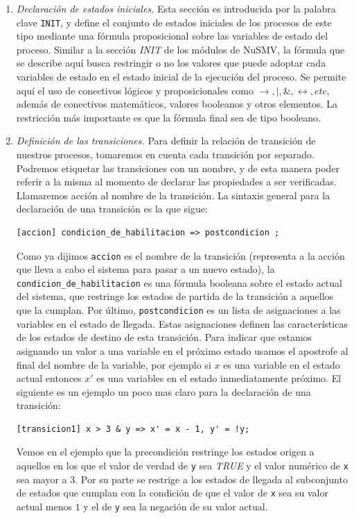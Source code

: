 \documentclass[titlepage, 12pt]{book}
\begin{document}
\begin{enumerate}
\item \textit{Declaraci\'on de estados iniciales.}
Esta secci\'on es introducida por la palabra clave \texttt{INIT}, y define el conjunto de estados iniciales de los procesos de este tipo mediante una f\'ormula proposicional sobre las variables de estado del proceso. Similar a la secci\'on \textit{INIT} de los m\'odulos de NuSMV, la f\'ormula que se describe aqu\'i busca restringir o no los valores que puede adoptar cada variables de estado en el estado inicial de la ejecuci\'on del proceso. Se permite aqu\'i el uso de conectivos l\'ogicos y proposicionales como $\rightarrow, |, \&, \leftrightarrow, etc$, adem\'as de conectivos matem\'aticos, valores booleanos y otros elementos. La restricci\'on m\'as importante es que la f\'ormula final sea de tipo booleano.

\item \textit{Definici\'on de las transiciones.}
Para definir la relaci\'on de transici\'on de nuestros procesos, tomaremos en cuenta cada transici\'on por separado. Podremos etiquetar las transiciones con un nombre, y de esta manera poder referir a la misma al momento de declarar las propiedades a ser verificadas. Llamaremos acci\'on al nombre de la transici\'on. La sintaxis general para la declaraci\'on de una transici\'on es la que sigue: 
\begin{verbatim}
[accion] condicion_de_habilitacion => postcondicion ;
\end{verbatim}
Como ya dijimos \texttt{accion} es el nombre de la transici\'on (representa a la acci\'on que lleva a cabo el sistema para pasar a un nuevo estado), la \texttt{condicion\_de\_habilitacion} es una f\'ormula booleana sobre el estado actual del sistema, que restringe los estados de partida de la transici\'on a aquellos que la cumplan. Por \'ultimo, \texttt{postcondicion} es un lista de asignaciones a las variables en el estado de llegada. Estas asignaciones definen las caracter\'isticas de los estados de destino de esta transici\'on. Para indicar que estamos asignando un valor a una variable en el pr\'oximo estado usamos el apostrofe al final del nombre de la variable, por ejemplo si $x$ es una variable en el estado actual entonces $x'$ es una variables en el estado inmediatamente pr\'oximo. El siguiente es un ejemplo un poco mas claro para la declaraci\'on de una transici\'on:
\begin{verbatim}
[transicion1] x > 3 & y => x' = x - 1, y' = !y;
\end{verbatim}
Vemos en el ejemplo que la precondici\'on restringe los estados origen a aquellos en los que el valor de verdad de \texttt{y} sea \textit{TRUE} y el valor num\'erico de \texttt{x} sea mayor a $3$. Por su parte se restrige a los estados de llegada al subconjunto de estados que cumplan con la condici\'on de que el valor de \texttt{x} sea su valor actual menos $1$ y el de \texttt{y} sea la negaci\'on de su valor actual.
\end{enumerate}
\end{document}
